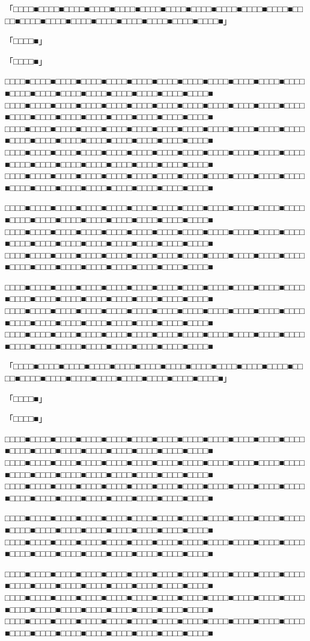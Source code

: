 \documentclass[
tate,
book,
openany,
paper={202mm,270mm},
oneside,
fontsize=9pt, %
jafontsize=9pt, %
head_space=11truemm, %
gutter=8truemm, %
line_length=78zw, %
number_of_lines=35, %
column_gap=5truemm,%
headfoot_verticalposition=4truemm,%
draft
]{jlreq}
\begin{document}
\begin{multicols*}{3}
「□□□□■□□□□■□□□□■□□□□■□□□□■□□□□■□□□□■□□□□■□□□□■□□□□■□□□□■□□□□■□□□□■□□□□■□□□□■□□□□■□□□□■□□□□■□□□□■□□□□■」

「□□□□■」

「□□□□■」

□□□□■□□□□■□□□□■□□□□■□□□□■□□□□■□□□□■□□□□■□□□□■□□□□■□□□□■□□□□■□□□□■□□□□■□□□□■□□□□■□□□□■□□□□■□□□□■□□□□■
□□□□■□□□□■□□□□■□□□□■□□□□■□□□□■□□□□■□□□□■□□□□■□□□□■□□□□■□□□□■□□□□■□□□□■□□□□■□□□□■□□□□■□□□□■□□□□■□□□□■
□□□□■□□□□■□□□□■□□□□■□□□□■□□□□■□□□□■□□□□■□□□□■□□□□■□□□□■□□□□■□□□□■□□□□■□□□□■□□□□■□□□□■□□□□■□□□□■□□□□■
□□□□■□□□□■□□□□■□□□□■□□□□■□□□□■□□□□■□□□□■□□□□■□□□□■□□□□■□□□□■□□□□■□□□□■□□□□■□□□□■□□□□■□□□□■□□□□■□□□□■
□□□□■□□□□■□□□□■□□□□■□□□□■□□□□■□□□□■□□□□■□□□□■□□□□■□□□□■□□□□■□□□□■□□□□■□□□□■□□□□■□□□□■□□□□■□□□□■□□□□■

□□□□■□□□□■□□□□■□□□□■□□□□■□□□□■□□□□■□□□□■□□□□■□□□□■□□□□■□□□□■□□□□■□□□□■□□□□■□□□□■□□□□■□□□□■□□□□■□□□□■
□□□□■□□□□■□□□□■□□□□■□□□□■□□□□■□□□□■□□□□■□□□□■□□□□■□□□□■□□□□■□□□□■□□□□■□□□□■□□□□■□□□□■□□□□■□□□□■□□□□■
□□□□■□□□□■□□□□■□□□□■□□□□■□□□□■□□□□■□□□□■□□□□■□□□□■□□□□■□□□□■□□□□■□□□□■□□□□■□□□□■□□□□■□□□□■□□□□■□□□□■

□□□□■□□□□■□□□□■□□□□■□□□□■□□□□■□□□□■□□□□■□□□□■□□□□■□□□□■□□□□■□□□□■□□□□■□□□□■□□□□■□□□□■□□□□■□□□□■□□□□■
□□□□■□□□□■□□□□■□□□□■□□□□■□□□□■□□□□■□□□□■□□□□■□□□□■□□□□■□□□□■□□□□■□□□□■□□□□■□□□□■□□□□■□□□□■□□□□■□□□□■
□□□□■□□□□■□□□□■□□□□■□□□□■□□□□■□□□□■□□□□■□□□□■□□□□■□□□□■□□□□■□□□□■□□□□■□□□□■□□□□■□□□□■□□□□■□□□□■□□□□■

「□□□□■□□□□■□□□□■□□□□■□□□□■□□□□■□□□□■□□□□■□□□□■□□□□■□□□□■□□□□■□□□□■□□□□■□□□□■□□□□■□□□□■□□□□■□□□□■□□□□■」

「□□□□■」

「□□□□■」

□□□□■□□□□■□□□□■□□□□■□□□□■□□□□■□□□□■□□□□■□□□□■□□□□■□□□□■□□□□■□□□□■□□□□■□□□□■□□□□■□□□□■□□□□■□□□□■□□□□■
□□□□■□□□□■□□□□■□□□□■□□□□■□□□□■□□□□■□□□□■□□□□■□□□□■□□□□■□□□□■□□□□■□□□□■□□□□■□□□□■□□□□■□□□□■□□□□■□□□□■
□□□□■□□□□■□□□□■□□□□■□□□□■□□□□■□□□□■□□□□■□□□□■□□□□■□□□□■□□□□■□□□□■□□□□■□□□□■□□□□■□□□□■□□□□■□□□□■□□□□■

□□□□■□□□□■□□□□■□□□□■□□□□■□□□□■□□□□■□□□□■□□□□■□□□□■□□□□■□□□□■□□□□■□□□□■□□□□■□□□□■□□□□■□□□□■□□□□■□□□□■
□□□□■□□□□■□□□□■□□□□■□□□□■□□□□■□□□□■□□□□■□□□□■□□□□■□□□□■□□□□■□□□□■□□□□■□□□□■□□□□■□□□□■□□□□■□□□□■□□□□■

□□□□■□□□□■□□□□■□□□□■□□□□■□□□□■□□□□■□□□□■□□□□■□□□□■□□□□■□□□□■□□□□■□□□□■□□□□■□□□□■□□□□■□□□□■□□□□■□□□□■
□□□□■□□□□■□□□□■□□□□■□□□□■□□□□■□□□□■□□□□■□□□□■□□□□■□□□□■□□□□■□□□□■□□□□■□□□□■□□□□■□□□□■□□□□■□□□□■□□□□■
□□□□■□□□□■□□□□■□□□□■□□□□■□□□□■□□□□■□□□□■□□□□■□□□□■□□□□■□□□□■□□□□■□□□□■□□□□■□□□□■□□□□■□□□□■□□□□■□□□□■


\end{multicols*}
\end{document}

